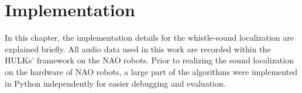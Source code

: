 \chapter{Implementation}
\label{chap:03_implementation}

In this chapter, the implementation details for the whistle-sound
localization are explained briefly.
All audio data used in this work are recorded within the HULKs' framework
on the NAO robots.
Prior to realizing the sound localization on the hardware of NAO robots,
a large part of the algorithms were implemented in Python  independently
for easier debugging and evaluation.







% 
